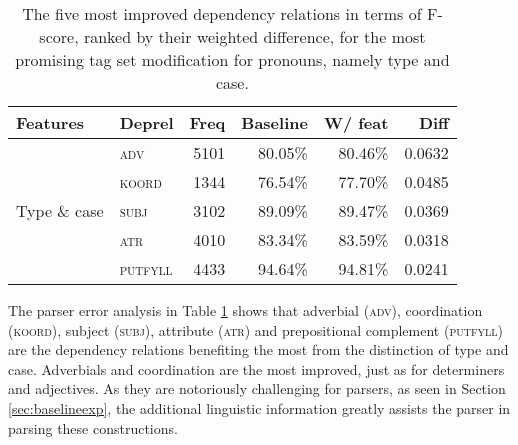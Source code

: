 \documentclass[a4paper,12pt,english]{book}
\begin{document}
\begin{table}
    \centering
    \smaller[0.5]
    \begin{tabular}{@{}llrrrr@{}}
        \toprule
        \textbf{Features} & \textbf{Deprel} & \textbf{Freq} &
        \textbf{Baseline} & \textbf{W/ feat} & \textbf{Diff} \\
        \midrule
        \multirow{5}{*}{Type \& case}
        & \textsc{adv} & 5101 & 80.05\% & 80.46\% & 0.0632 \\
        & \textsc{koord} & 1344 & 76.54\% & 77.70\% & 0.0485 \\
        & \textsc{subj} & 3102 & 89.09\% & 89.47\% & 0.0369 \\
        & \textsc{atr} & 4010 & 83.34\% & 83.59\% & 0.0318 \\
        & \textsc{putfyll} & 4433 & 94.64\% & 94.81\% & 0.0241\\
        \bottomrule
    \end{tabular}
    \caption{The five most improved dependency relations in terms of F-score,
        ranked by their weighted difference, for the most promising tag set
        modification for pronouns, namely type and case.}
    \label{pronparseerror}
\end{table}

The parser error analysis in Table \ref{pronparseerror} shows that adverbial
(\textsc{adv}), coordination (\textsc{koord}), subject (\textsc{subj}),
attribute (\textsc{atr}) and prepositional complement (\textsc{putfyll}) are
the dependency relations benefiting the most from the distinction of type and
case. Adverbials and coordination are the most improved, just as for
determiners and adjectives. As they are notoriously challenging for parsers, as
seen in Section \ref{sec:baselineexp}, the additional linguistic information
greatly assists the parser in parsing these constructions.
\end{document}

